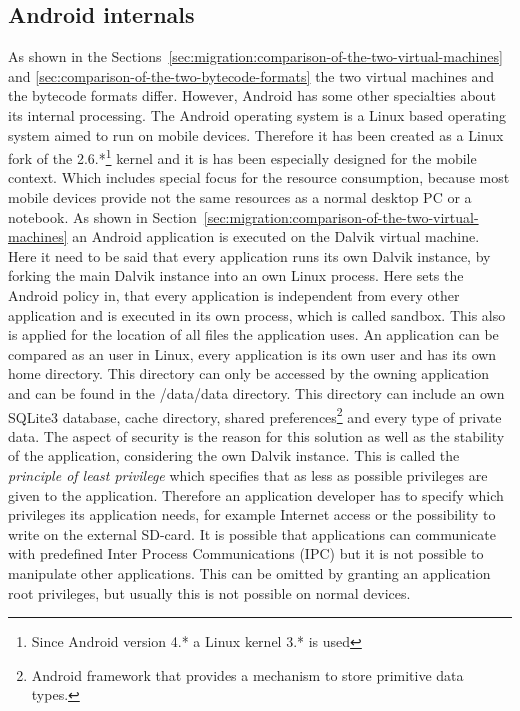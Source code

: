 \subsection{Android internals}
\label{sec:android-internals}
As shown in the Sections~\ref{sec:migration:comparison-of-the-two-virtual-machines} and \ref{sec:comparison-of-the-two-bytecode-formats} the two virtual machines and the bytecode formats differ.
However, Android has some other specialties about its internal processing.
The Android operating system is a Linux based operating system aimed to run on mobile devices.
Therefore it has been created as a Linux fork of the 2.6.*\footnote{Since Android version 4.* a Linux kernel 3.* is used} kernel and it is has been especially designed for the mobile context.
Which includes special focus for the resource consumption, because most mobile devices provide not the same resources as a normal desktop PC or a notebook.
As shown in Section~\ref{sec:migration:comparison-of-the-two-virtual-machines} an Android application is executed on the Dalvik virtual machine.
Here it need to be said that every application runs its own Dalvik instance, by forking the main Dalvik instance into an own Linux process.
Here sets the Android policy in, that every application is independent from every other application and is executed in its own process, which is called sandbox.
This also is applied for the location of all files the application uses.
An application can be compared as an user in Linux, every application is its own user and has its own home directory.
This directory can only be accessed by the owning application and can be found in the /data/data directory.
This directory can include an own SQLite3 database, cache directory, shared preferences\footnote{Android framework that provides a mechanism to store primitive data types.} and every type of private data.
The aspect of security is the reason for this solution as well as the stability of the application, considering the own Dalvik instance.
This is called the \textit{principle of least privilege} which specifies that as less as possible privileges are given to the application.
Therefore an application developer has to specify which privileges its application needs, for example Internet access or the possibility to write on the external SD-card.
It is possible that applications can communicate with predefined Inter Process Communications (IPC) but it is not possible to manipulate other applications.
This can be omitted by granting an application root privileges, but usually this is not possible on normal devices.
